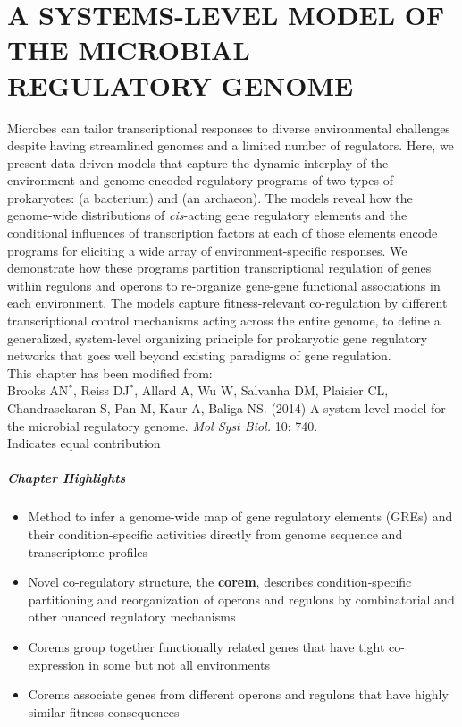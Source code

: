  
\chapter {\uppercase{A systems-level model of the microbial regulatory genome}}
\label{chap:3}

 Microbes can tailor transcriptional responses to diverse environmental challenges despite having streamlined genomes and a limited number of regulators. Here, we present data-driven models that capture the dynamic interplay of the environment and genome-encoded regulatory programs of two types of prokaryotes: \eco (a bacterium) and \halo (an archaeon). The models reveal how the genome-wide distributions of \textit{cis}-acting gene regulatory elements and the conditional influences of transcription factors at each of those elements encode programs for eliciting a wide array of environment-specific responses. We demonstrate how these programs partition transcriptional regulation of genes within regulons and operons to re-organize gene-gene functional associations in each environment. The models capture fitness-relevant co-regulation by different transcriptional control mechanisms acting across the entire genome, to define a generalized, system-level organizing principle for prokaryotic gene regulatory networks that goes well beyond existing paradigms of gene regulation.\\


 \noindent This chapter has been modified from:\\

\noindent Brooks AN$^{*}$, Reiss DJ$^{*}$, Allard A, Wu W, Salvanha DM, Plaisier CL, Chandrasekaran S, Pan M, Kaur A, Baliga NS. (2014) A system-level model for the microbial regulatory genome. \emph{Mol Syst Biol.}  10: 740.\\

 \noindent * Indicates equal contribution 

\paragraph{Chapter Highlights}

\begin{itemize}
\item Method to infer a genome-wide map of gene regulatory elements (GREs) and their 
condition-specific activities directly from genome sequence and transcriptome profiles
\item Novel co-regulatory structure, the \textbf{corem}, describes condition-specific partitioning 
and reorganization of operons and regulons by combinatorial and other nuanced regulatory mechanisms
\item Corems group together functionally related genes that have tight co-expression in 
some but not all environments
\item Corems associate genes from different operons and regulons that have highly similar 
fitness consequences
\end{itemize}


